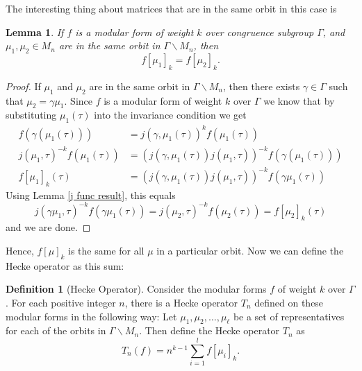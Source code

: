 \documentclass{article}
\newtheorem{lemma}[theorem]{Lemma}
\theoremstyle{definition}
\newtheorem{definition}{Definition}[section]
\theoremstyle{definition}
\theoremstyle{definition}
\begin{document}
The interesting thing about matrices that are in the same orbit in this case is
\begin{lemma}
    If $f$ is a modular form of weight $k$ over congruence subgroup $\Gamma$, and $\mu_1,\mu_2\in M_n$ are in the same orbit in $\Gamma \backslash M_n$, then
    $$f[\mu_1]_k=f[\mu_2]_k.$$
\end{lemma}
\begin{proof}
    If $\mu_1$ and $\mu_2$ are in the same orbit in $\Gamma \backslash M_n$, then there exists $\gamma\in\Gamma$ such that $\mu_2=\gamma\mu_1$. Since $f$ is a modular form of weight $k$ over $\Gamma$ we know that by substituting $\mu_1(\tau)$ into the invariance condition we get
    \begin{align*}
    f(\gamma(\mu_1(\tau)))&=j(\gamma,\mu_1(\tau))^kf(\mu_1(\tau))\\
    j(\mu_1,\tau)^{-k}f(\mu_1(\tau))&=(j(\gamma,\mu_1(\tau))j(\mu_1,\tau))^{-k}f(\gamma(\mu_1(\tau)))
    \\
    f[\mu_1]_k(\tau)&=(j(\gamma,\mu_1(\tau))j(\mu_1,\tau))^{-k}f(\gamma\mu_1(\tau))
    \end{align*}
    Using Lemma \ref{j func result}, this equals
$$j(\gamma\mu_1,\tau)^{-k}f(\gamma\mu_1(\tau))=j(\mu_2,\tau)^{-k}f(\mu_2(\tau))=f[\mu_2]_k(\tau)$$
and we are done.
\end{proof}

Hence, $f[\mu]_k$ is the same for all $\mu$ in a particular orbit. Now we can define the Hecke operator as this sum:

\begin{definition}[Hecke Operator]
    Consider the modular forms $f$ of weight $k$ over $\Gamma$. For each positive integer $n$, there is a Hecke operator $T_n$ defined on these modular forms in the following way: Let $\mu_1,\mu_2,\dots,\mu_\ell$  be a set of representatives for each of the orbits in $\Gamma\backslash M_n$. Then define the Hecke operator $T_n$ as
    $$T_n(f)=n^{k-1}\sum_{i=1}^l f[\mu_i]_k.$$
\end{definition}
\end{document}
